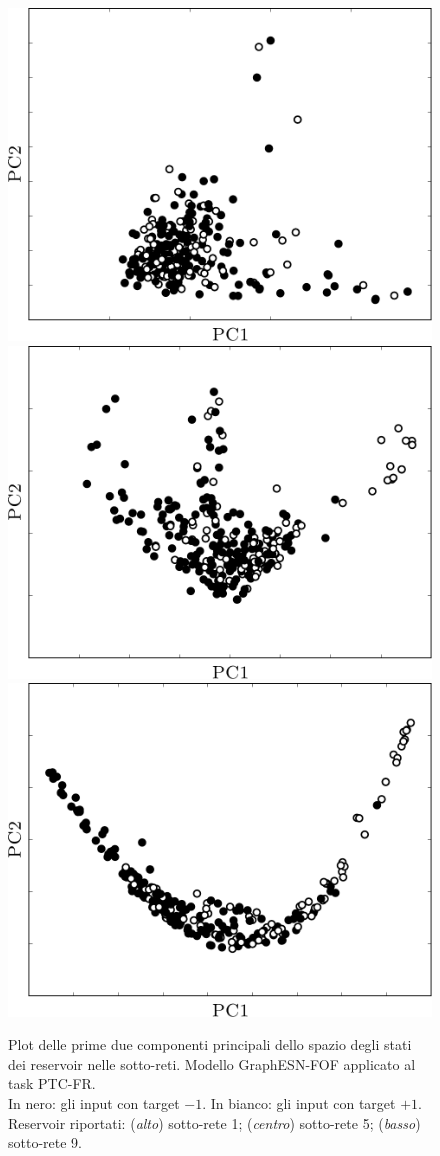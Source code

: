 \begin{figure}[p]
\centering
\includegraphics[width=0.5\columnwidth]{img/pca/pca-ptc-fof1}\\
\vspace*{0.8cm}
\includegraphics[width=0.5\columnwidth]{img/pca/pca-ptc-fof2}\\
\vspace*{0.8cm}
\includegraphics[width=0.5\columnwidth]{img/pca/pca-ptc-fof3}\\
\medskip
\caption[PCA dei reservoir. GraphESN-FOF su PTC-FR.]{Plot delle prime due componenti principali dello spazio degli stati dei reservoir nelle sotto-reti. Modello GraphESN-FOF applicato al task PTC-FR.\\ 
In nero: gli input con target $-1$. In bianco: gli input con target $+1$.\\
Reservoir riportati: (\emph{alto}) sotto-rete 1; (\emph{centro}) sotto-rete 5; (\emph{basso}) sotto-rete 9.}
\label{fig:esperimenti:pca-ptc-fof}
\end{figure}
